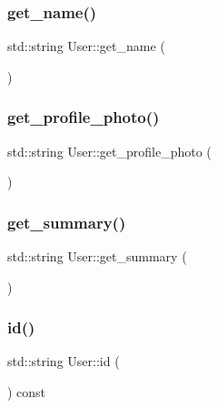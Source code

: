 \subsubsection{\texorpdfstring{get\+\_\+name()}{get\_name()}}
{\footnotesize\ttfamily std\+::string User\+::get\+\_\+name (\begin{DoxyParamCaption}{ }\end{DoxyParamCaption})}

\mbox{\label{classUser_aca8fcd8329ceba292fc4b762962f514a}} 
\subsubsection{\texorpdfstring{get\+\_\+profile\+\_\+photo()}{get\_profile\_photo()}}
{\footnotesize\ttfamily std\+::string User\+::get\+\_\+profile\+\_\+photo (\begin{DoxyParamCaption}{ }\end{DoxyParamCaption})}

\mbox{\label{classUser_abd12a463644dad79711a99e9b4ca5f81}} 
\subsubsection{\texorpdfstring{get\+\_\+summary()}{get\_summary()}}
{\footnotesize\ttfamily std\+::string User\+::get\+\_\+summary (\begin{DoxyParamCaption}{ }\end{DoxyParamCaption})}

\mbox{\label{classUser_ac140c8f3831f0c137a0356b5c5d1ac0c}} 
\subsubsection{\texorpdfstring{id()}{id()}}
{\footnotesize\ttfamily std\+::string User\+::id (\begin{DoxyParamCaption}{ }\end{DoxyParamCaption}) const}

\mbox{\label{classUser_a6b431d3face2db990dcdf48d74e745d6}} 
